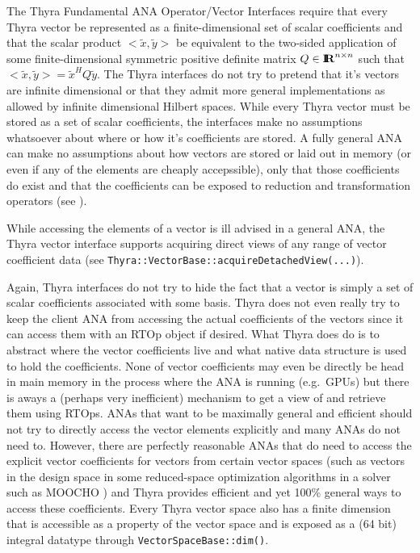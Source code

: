 \documentclass[11pt]{SANDreport}
\begin{document}
The Thyra Fundamental ANA Operator/Vector Interfaces require that every Thyra vector be represented as a finite-dimensional set of scalar coefficients and that the scalar product $<\tilde{x},\tilde{y}>$ be equivalent to the two-sided application of some finite-dimensional symmetric positive definite matrix $Q\in\mbox{\textbf{I}}\hspace{-0.6ex}\mbox{\textbf{R}}^{n\times{}n}$ such that $<\tilde{x},\tilde{y}> = \tilde{x}^H Q \tilde{y}$.  The Thyra interfaces do not try to pretend that it's vectors are infinite dimensional or that they admit more general implementations as allowed by infinite dimensional Hilbert spaces. While every Thyra vector must be stored as a set of scalar coefficients, the interfaces make no assumptions whatsoever about where or how it's coefficients are stored.  A fully general ANA can make no assumptions about how vectors are stored or laid out in memory (or even if any of the elements are cheaply accepssible), only that those coefficients do exist and that the coefficients can be exposed to reduction and transformation operators (see \cite{ref:rtop_toms}).

While accessing the elements of a vector is ill advised in a general ANA, the Thyra vector interface supports acquiring direct views of any range of vector coefficient data (see \texttt{Thyra::\-Vector\-Base\-::\-acquireDetachedView(...)}).

Again, Thyra interfaces do not try to hide the fact that a vector is simply a set of scalar coefficients associated with some basis.  Thyra does not even really try to keep the client ANA from accessing the actual coefficients of the vectors since it can access them with an RTOp object if desired.  What Thyra does do is to abstract where the vector coefficients live and what native data structure is used to hold the coefficients.  None of vector coefficients may even be directly be head in main memory in the process where the ANA is running (e.g.\ GPUs) but there is aways a (perhaps very inefficient) mechanism to get a view of and retrieve them using RTOps.  ANAs that want to be maximally general and efficient should not try to directly access the vector elements explicitly and many ANAs do not need to. However, there are perfectly reasonable ANAs that do need to access the explicit vector coefficients for vectors from certain vector spaces (such as vectors in the design space in some reduced-space optimization algorithms in a solver such as MOOCHO \cite{MOOCHO}) and Thyra provides efficient and yet 100\% general ways to access these coefficients.  Every Thyra vector space also has a finite dimension that is accessible as a property of the vector space and is exposed as a (64 bit) integral datatype through \texttt{Vector\-Space\-Base\-::dim()}.
\end{document}

